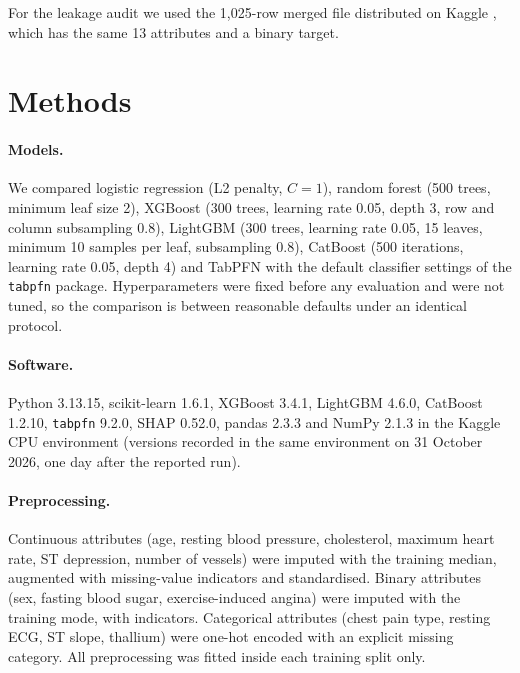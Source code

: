 \documentclass[11pt]{article}
\begin{document}
\begin{table}[t]
\centering
\caption{Patients and disease prevalence per hospital after removing exact duplicates.}
\label{tab:sites}

\end{table}

For the leakage audit we used the 1,025-row merged file distributed on Kaggle \citep{lapp2019kaggle}, which has the same 13 attributes and a binary target.

\section{Methods}
\paragraph{Models.} We compared logistic regression (L2 penalty, $C=1$), random forest (500 trees, minimum leaf size 2), XGBoost (300 trees, learning rate 0.05, depth 3, row and column subsampling 0.8), LightGBM (300 trees, learning rate 0.05, 15 leaves, minimum 10 samples per leaf, subsampling 0.8), CatBoost (500 iterations, learning rate 0.05, depth 4) and TabPFN \citep{hollmann2025tabpfn} with the default classifier settings of the \texttt{tabpfn} package. Hyperparameters were fixed before any evaluation and were not tuned, so the comparison is between reasonable defaults under an identical protocol.

\paragraph{Software.} Python 3.13.15, scikit-learn 1.6.1, XGBoost 3.4.1, LightGBM 4.6.0, CatBoost 1.2.10, \texttt{tabpfn} 9.2.0, SHAP 0.52.0, pandas 2.3.3 and NumPy 2.1.3 in the Kaggle CPU environment (versions recorded in the same environment on 31 October 2026, one day after the reported run).

\paragraph{Preprocessing.} Continuous attributes (age, resting blood pressure, cholesterol, maximum heart rate, ST depression, number of vessels) were imputed with the training median, augmented with missing-value indicators and standardised. Binary attributes (sex, fasting blood sugar, exercise-induced angina) were imputed with the training mode, with indicators. Categorical attributes (chest pain type, resting ECG, ST slope, thallium) were one-hot encoded with an explicit missing category. All preprocessing was fitted inside each training split only.
\end{document}
